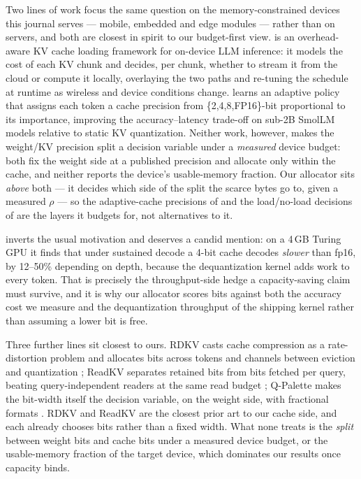 \documentclass[10pt,journal]{IEEEtran}
\newcommand{\rhoSym}{\rho}
\begin{document}
Two lines of work focus the same question on the memory-constrained devices this
journal serves --- mobile, embedded and edge modules --- rather than on servers,
and both are closest in spirit to our budget-first view. \cite{sparkv} is an
overhead-aware KV cache loading framework for on-device LLM inference: it models
the cost of each KV chunk and decides, per chunk, whether to stream it from the
cloud or compute it locally, overlaying the two paths and re-tuning the schedule
at runtime as wireless and device conditions change. \cite{dontwastebits} learns
an adaptive policy that assigns each token a cache precision from
\{2,4,8,FP16\}-bit proportional to its importance, improving the
accuracy--latency trade-off on sub-2B SmolLM models relative to static KV
quantization. Neither work, however, makes the weight/KV precision split a
decision variable under a \emph{measured} device budget: both fix the weight
side at a published precision and allocate only within the cache, and neither
reports the device's usable-memory fraction. Our allocator sits \emph{above}
both --- it decides which side of the split the scarce bytes go to, given a
measured $\rhoSym$ --- so the adaptive-cache precisions of \cite{dontwastebits}
and the load/no-load decisions of \cite{sparkv} are the layers it budgets for,
not alternatives to it.

\cite{kv4} inverts the usual motivation and deserves a candid mention: on a
4\,GB Turing GPU it finds that under sustained decode a 4-bit cache decodes
\emph{slower} than fp16, by 12--50\% depending on depth, because the
dequantization kernel adds work to every token. That is precisely the
throughput-side hedge a capacity-saving claim must survive, and it is why our
allocator scores bits against both the accuracy cost we measure and the
dequantization throughput of the shipping kernel rather than assuming a lower
bit is free.

Three further lines sit closest to ours. RDKV casts cache compression as a rate-distortion
problem and allocates bits across tokens and channels between eviction and
quantization \cite{rdkv}; ReadKV separates retained bits from bits fetched per
query, beating query-independent readers at the same read budget \cite{readkv};
Q-Palette makes the bit-width itself the decision variable, on the weight side,
with fractional formats \cite{qpalette}. RDKV and ReadKV are the closest prior art
to our cache side, and each already chooses bits rather than a fixed width. What
none treats is the \emph{split} between weight bits and cache bits under a measured
device budget, or the usable-memory fraction of the target device, which dominates
our results once capacity binds.
\end{document}

